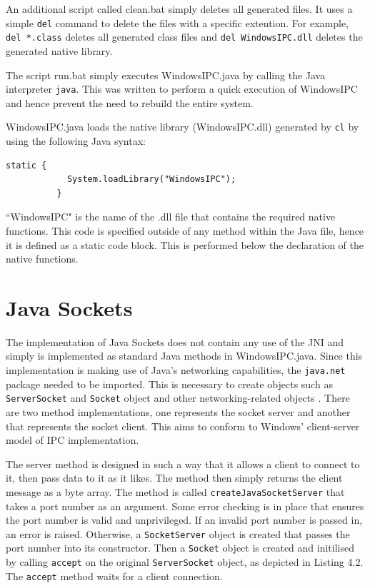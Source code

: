 \documentclass[12pt] {newrucsthesis}    %
\def\code#1{\texttt{#1}}
\begin{document}
        An additional script called clean.bat simply deletes all generated files. It uses a simple \code{del}
        command to delete the files with a specific extention. For example, \code{del *.class}
        deletes all generated class files and \code{del WindowsIPC.dll} deletes the generated native library.

        The script run.bat simply executes WindowsIPC.java by calling the Java interpreter \code{java}.
        This was written to perform a quick execution of WindowsIPC and hence prevent the need to rebuild
        the entire system.

        WindowsIPC.java loads the native library (WindowsIPC.dll) generated by \code{cl} by using the following Java syntax:
        \begin {lstlisting}[caption=Loading The Native Library]
          static {
            System.loadLibrary("WindowsIPC");
          }
        \end{lstlisting}
        ``WindowsIPC" is the name of the .dll file that contains the required native functions. This code
        is specified outside of any method within the Java file, hence it is defined as a static code block.
        This is performed below the declaration of the native functions.


    \section{Java Sockets} \label{jsockssections}
      The implementation of Java Sockets does not contain any use of the JNI and simply is implemented
      as standard Java methods in WindowsIPC.java. Since this
      implementation is making use of Java's networking capabilities,
      the \code{java.net} package needed to be imported. This is necessary to create objects such as
      \code{ServerSocket} and \code{Socket} object and other networking-related objects \citep{JavaAPI}.
      There are two method implementations, one represents
      the socket server and another that represents the socket client. This aims to conform to Windows' client-server
      model of IPC implementation.

      The server method is designed in such a way that
      it allows a client to connect to it, then pass data to it as it likes. The method then simply returns
      the client message as a byte array. The method is called \code{createJavaSocketServer} that takes a port number as an argument.
      Some error checking is in place that ensures the port number is valid and unprivileged.
      If an invalid port number is passed in, an error is raised.
      Otherwise, a \code{SocketServer} object is created that passes the port number into its constructor.
      Then a \code{Socket} object is created and initilised by calling \code{accept} on the original
      \code{ServerSocket} object, as depicted in Listing 4.2. The \code{accept} method waits
      for a client connection.
\end{document}
